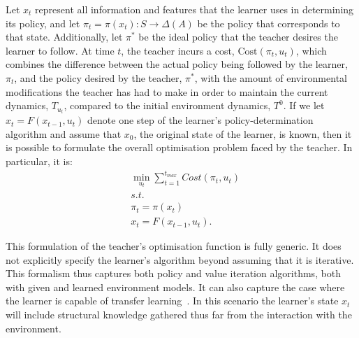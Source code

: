 Let $x_t$ represent all information and features that the learner uses
in determining its policy, and let
$\pi_t=\pi(x_t):S\rightarrow\Delta(A)$ be the policy that corresponds
to that state.  Additionally, let $\pi^*$ be the ideal policy that the
teacher desires the learner to follow.  At time $t$, the teacher
incurs a cost, $\mathrm{Cost}(\pi_t,u_t)$, which combines the
difference between the actual policy being followed by the learner,
$\pi_t$, and the policy desired by the teacher, $\pi^*$, with the
amount of environmental modifications the teacher has had to make in
order to maintain the current dynamics, $T_{u_t}$, compared to the
initial environment dynamics, $T^0$. If we let $x_t=F(x_{t-1},u_t)$
denote one step of the learner's policy-determination algorithm and
assume that $x_0$, the original state of the learner, is known, then
it is possible to formulate the overall optimisation problem faced by
the teacher.  In particular, it is:
\begin{eqnarray*}
&\min\limits_{u_t}\sum\limits_{t=1}^{t_{max}}Cost(\pi_t,u_t)\\
&s.t.\\
&\pi_t=\pi(x_t)\\
&x_t=F(x_{t-1},u_t).
\end{eqnarray*}




This formulation of the teacher's optimisation function is fully
generic. It does not explicitly specify the learner's algorithm beyond
assuming that it is iterative. This formalism thus captures both
policy and value iteration algorithms, both with given and learned
environment models.  It can also capture the case where the learner is
capable of transfer learning~\cite{ taylor_stone_2009}. In this
scenario the learner's state $x_t$ will include structural knowledge
gathered thus far from the interaction with the environment.

